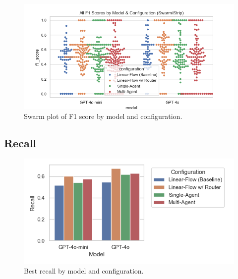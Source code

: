                 \begin{figure}[H]
                    \centering
                    \includegraphics[scale=0.75]{images_exp2/swarm_f1_by_model_and_configuration.png}
                    \caption{Swarm plot of F1 score by model and configuration.}
                    \label{fig:swarm_f1_by_model_and_configuration}
                \end{figure}


            \subsection{Recall}


                \begin{figure}[H]
                    \centering
                    \includegraphics[scale=0.75]{images_exp2/recall/bar_best_recall_by_model_and_configuration.png}
                    \caption{Best recall by model and configuration.}
                    \label{fig:bar_best_recall_by_model_and_configuration}
                \end{figure}

